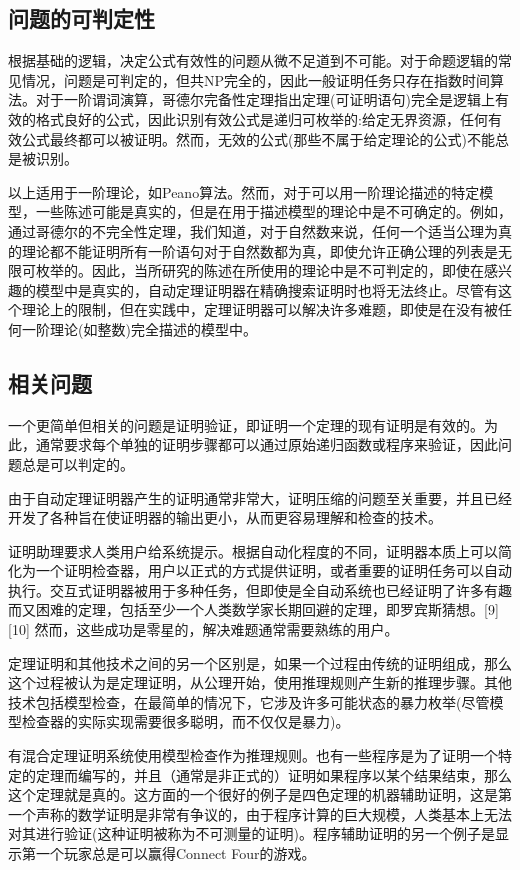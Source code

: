 \subsection{问题的可判定性}
根据基础的逻辑，决定公式有效性的问题从微不足道到不可能。对于命题逻辑的常见情况，问题是可判定的，但共NP完全的，因此一般证明任务只存在指数时间算法。对于一阶谓词演算，哥德尔完备性定理指出定理(可证明语句)完全是逻辑上有效的格式良好的公式，因此识别有效公式是递归可枚举的:给定无界资源，任何有效公式最终都可以被证明。然而，无效的公式(那些不属于给定理论的公式)不能总是被识别。

以上适用于一阶理论，如Peano算法。然而，对于可以用一阶理论描述的特定模型，一些陈述可能是真实的，但是在用于描述模型的理论中是不可确定的。例如，通过哥德尔的不完全性定理，我们知道，对于自然数来说，任何一个适当公理为真的理论都不能证明所有一阶语句对于自然数都为真，即使允许正确公理的列表是无限可枚举的。因此，当所研究的陈述在所使用的理论中是不可判定的，即使在感兴趣的模型中是真实的，自动定理证明器在精确搜索证明时也将无法终止。尽管有这个理论上的限制，但在实践中，定理证明器可以解决许多难题，即使是在没有被任何一阶理论(如整数)完全描述的模型中。

\subsection{相关问题}
一个更简单但相关的问题是证明验证，即证明一个定理的现有证明是有效的。为此，通常要求每个单独的证明步骤都可以通过原始递归函数或程序来验证，因此问题总是可以判定的。

由于自动定理证明器产生的证明通常非常大，证明压缩的问题至关重要，并且已经开发了各种旨在使证明器的输出更小，从而更容易理解和检查的技术。

证明助理要求人类用户给系统提示。根据自动化程度的不同，证明器本质上可以简化为一个证明检查器，用户以正式的方式提供证明，或者重要的证明任务可以自动执行。交互式证明器被用于多种任务，但即使是全自动系统也已经证明了许多有趣而又困难的定理，包括至少一个人类数学家长期回避的定理，即罗宾斯猜想。[9][10] 然而，这些成功是零星的，解决难题通常需要熟练的用户。

定理证明和其他技术之间的另一个区别是，如果一个过程由传统的证明组成，那么这个过程被认为是定理证明，从公理开始，使用推理规则产生新的推理步骤。其他技术包括模型检查，在最简单的情况下，它涉及许多可能状态的暴力枚举(尽管模型检查器的实际实现需要很多聪明，而不仅仅是暴力)。

有混合定理证明系统使用模型检查作为推理规则。也有一些程序是为了证明一个特定的定理而编写的，并且（通常是非正式的）证明如果程序以某个结果结束，那么这个定理就是真的。这方面的一个很好的例子是四色定理的机器辅助证明，这是第一个声称的数学证明是非常有争议的，由于程序计算的巨大规模，人类基本上无法对其进行验证(这种证明被称为不可测量的证明)。程序辅助证明的另一个例子是显示第一个玩家总是可以赢得Connect Four的游戏。

